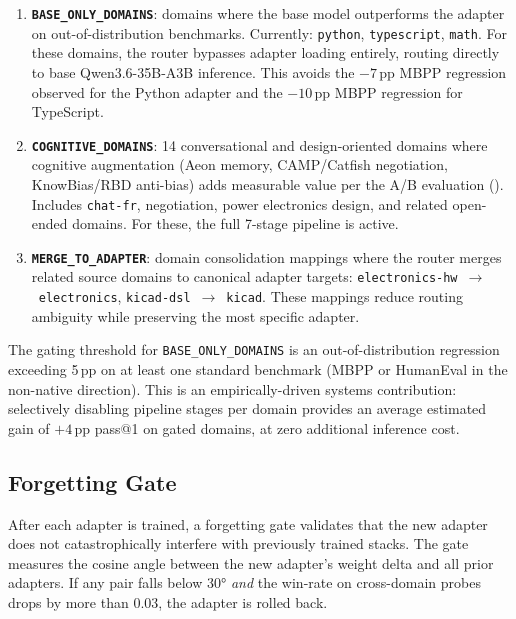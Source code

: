 \documentclass[11pt,a4paper]{article}
\begin{document}
\begin{enumerate}[nosep]
  \item \textbf{\texttt{BASE\_ONLY\_DOMAINS}}: domains where the base model outperforms the adapter on out-of-distribution benchmarks. Currently: \texttt{python}, \texttt{typescript}, \texttt{math}. For these domains, the router bypasses adapter loading entirely, routing directly to base Qwen3.6-35B-A3B inference. This avoids the $-7$\,pp MBPP regression observed for the Python adapter and the $-10$\,pp MBPP regression for TypeScript.

  \item \textbf{\texttt{COGNITIVE\_DOMAINS}}: 14 conversational and design-oriented domains where cognitive augmentation (Aeon memory, CAMP/Catfish negotiation, KnowBias/RBD anti-bias) adds measurable value per the A/B evaluation (). Includes \texttt{chat-fr}, negotiation, power electronics design, and related open-ended domains. For these, the full 7-stage pipeline is active.

  \item \textbf{\texttt{MERGE\_TO\_ADAPTER}}: domain consolidation mappings where the router merges related source domains to canonical adapter targets: \texttt{electronics-hw}~$\rightarrow$~\texttt{electronics}, \texttt{kicad-dsl}~$\rightarrow$~\texttt{kicad}. These mappings reduce routing ambiguity while preserving the most specific adapter.
\end{enumerate}

The gating threshold for \texttt{BASE\_ONLY\_DOMAINS} is an out-of-distribution regression exceeding 5\,pp on at least one standard benchmark (MBPP or HumanEval in the non-native direction). This is an empirically-driven systems contribution: selectively disabling pipeline stages per domain provides an average estimated gain of $+4$\,pp pass@1 on gated domains, at zero additional inference cost.

\subsection{Forgetting Gate}

After each adapter is trained, a forgetting gate validates that the new adapter does not catastrophically interfere with previously trained stacks. The gate measures the cosine angle between the new adapter's weight delta and all prior adapters. If any pair falls below 30° \emph{and} the win-rate on cross-domain probes drops by more than 0.03, the adapter is rolled back.
\end{document}
